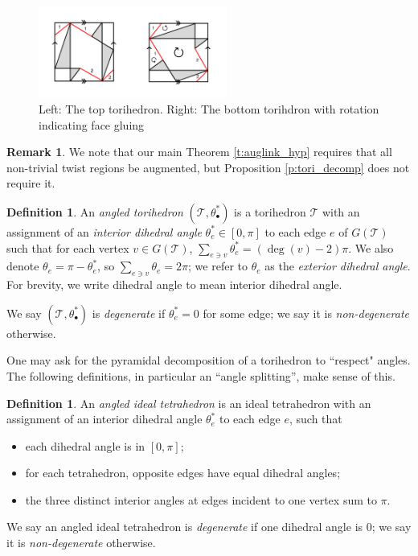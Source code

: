 \documentclass[11pt]{amsart}
\newcommand{\thmref}[1]{Theorem \ref{#1}}
\newcommand{\prpref}[1]{Proposition \ref{#1}}
\newcommand{\sT}{{\mathcal{T}}}
\theoremstyle{plain}
\theoremstyle{definition}
\newtheorem{define}[theorem]{Definition}
\newtheorem{definition}[theorem]{Definition}
\newtheorem{remark}[theorem]{Remark}
\begin{document}
\begin{figure}[h] 
\centering 
\includegraphics[height=3cm]{top-bottom-flippedarrows.png} 
	\caption{Left: The top torihedron.
	Right: The bottom torihdron with rotation indicating face gluing}
\label{fig:top-bottom}
\end{figure}


\begin{remark}
We note that our main \thmref{t:auglink_hyp}
requires that all non-trivial twist regions be augmented,
but \prpref{p:tori_decomp} does not require it.
\label{r:unnecessary-augment-bigon}
\end{remark}


\begin{definition}
An \emph{angled torihedron} $(\sT, \theta_\bullet^*)$
is a torihedron $\sT$ with
an assignment of an \emph{interior dihedral angle}
$\theta_e^* \in [0,\pi]$ to each edge $e$ of $G(\sT)$
such that for each vertex $v \in G(\sT)$,
$\sum_{e \ni v} \theta_e^* = (\deg(v) - 2)\pi$.
We also denote $\theta_e = \pi - \theta_e^*$,
so $\sum_{e \ni v} \theta_e = 2\pi$;
we refer to $\theta_e$ as the \emph{exterior dihedral angle}.
For brevity, we write dihedral angle to mean 
interior dihedral angle.  


We say $(\sT, \theta_\bullet^*)$ is \emph{degenerate}
if $\theta_e^* = 0$ for some edge;
we say it is \emph{non-degenerate} otherwise.
\end{definition}


One may ask for the pyramidal decomposition of a torihedron
to ``respect" angles. The following definitions,
in particular an ``angle splitting'', make sense of this.

\begin{samepage}
\begin{define}
An \emph{angled ideal tetrahedron} is an ideal tetrahedron
with an assignment of an
interior dihedral angle $\theta_e^*$ to each edge $e$, such that
\begin{itemize}
\item each dihedral angle is in $[0, \pi]$;
\item for each tetrahedron, opposite edges have equal dihedral angles;
\item the three distinct interior angles at edges incident to one vertex sum to $\pi$.
\end{itemize}

We say an angled ideal tetrahedron is \emph{degenerate} if
one dihedral angle is 0; we say it is \emph{non-degenerate} otherwise.
\end{define}
\end{samepage}
\end{document}
